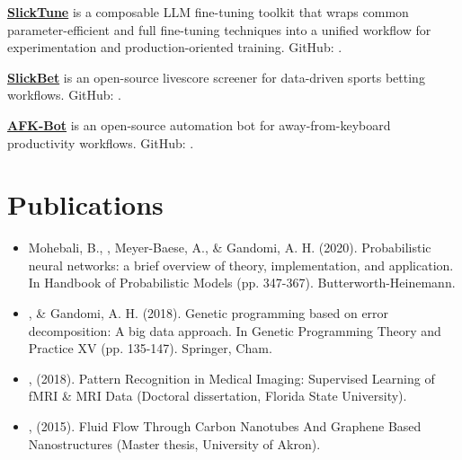 \documentclass[]{template}
\begin{document}
\sectionsep
{}
\textbf{\href{https://github.com/slickml/slick-tune}{SlickTune}} is a composable LLM fine-tuning toolkit that wraps common parameter-efficient and full fine-tuning techniques into a unified workflow for experimentation and production-oriented training. GitHub: .

\sectionsep
{}
\textbf{\href{https://github.com/slickml/slick-bet}{SlickBet}} is an open-source livescore screener for data-driven sports betting workflows. GitHub: .

\sectionsep
{}
\textbf{\href{https://github.com/slickml/afk-bot}{AFK-Bot}} is an open-source automation bot for away-from-keyboard productivity workflows. GitHub: .

\sectionsep
\hline
\sectionsep
\section{Publications}
\sectionsep
{}
\sectionsep
\begin{itemize}

\item Mohebali, B., , Meyer-Baese, A., \& Gandomi, A. H. (2020). Probabilistic neural networks: a brief overview of theory, implementation, and application. In Handbook of Probabilistic Models (pp. 347-367). Butterworth-Heinemann.

\item {}, \& Gandomi, A. H. (2018). Genetic programming based on error decomposition: A big data approach. In Genetic Programming Theory and Practice XV (pp. 135-147). Springer, Cham.


\item {}, (2018). Pattern Recognition in Medical Imaging: Supervised Learning of fMRI \& MRI Data (Doctoral dissertation, Florida State University).

\item {}, (2015). Fluid Flow Through Carbon Nanotubes And Graphene Based Nanostructures (Master thesis, University of Akron).


\end{itemize}
\end{document}
